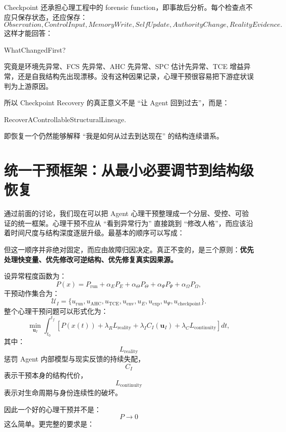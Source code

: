Checkpoint 还承担心理工程中的 forensic function，即事故后分析。每个检查点不应只保存状态，还应保存：
\[
Observation,
ControlInput,
MemoryWrite,
SelfUpdate,
AuthorityChange,
RealityEvidence.
\]
这样才能回答：
\begin{statementbox}
WhatChangedFirst?
\end{statementbox}
究竟是环境先异常、FCS 先异常、AHC 先异常、SPC 估计先异常、TCE 增益异常，还是自我结构先出现漂移。没有这种因果记录，心理干预很容易把下游症状误判为上游原因。

所以 Checkpoint Recovery 的真正意义不是 ``让 Agent 回到过去''，而是：
\begin{statementbox}
RecoverAControllableStructuralLineage.
\end{statementbox}
即恢复一个仍然能够解释 ``我是如何从过去到达现在'' 的结构连续谱系。

\section{统一干预框架：从最小必要调节到结构级恢复}

通过前面的讨论，我们现在可以把 Agent 心理干预整理成一个分层、受控、可验证的统一框架。心理干预不应从 ``看到异常行为'' 直接跳到 ``修改人格''，而应该沿着时间尺度与结构深度逐层升级。最基本的顺序可以写成：
\begin{statementbox}
\centering
{}
\end{statementbox}
但这一顺序并非绝对固定，而应由故障归因决定。真正不变的，是三个原则：\textbf{优先处理快变量、优先修改可逆结构、优先修复真实因果源。}

设异常程度函数为：
\[
P(x)
=
P_{\mathrm{run}}
+
\alpha_E P_E
+
\alpha_\Theta P_\Theta
+
\alpha_\Psi P_\Psi
+
\alpha_\Omega P_\Omega,
\]
干预动作集合为：
\[
\mathcal U_I
=
\{
u_{\mathrm{run}},
u_{\mathrm{AHC}},
u_{\mathrm{TCE}},
u_{\mathrm{env}},
u_E,
u_{\mathrm{exp}},
u_\Psi,
u_{\mathrm{checkpoint}}
\}.
\]
整个心理干预问题可以形式化为：
\[
\min_{\mathbf u_I}
\int_{t_0}^{t_f}
\left[
P(x(t))
+
\lambda_R L_{\mathrm{reality}}
+
\lambda_I C_I(\mathbf u_I)
+
\lambda_C L_{\mathrm{continuity}}
\right]dt,
\]
其中：
\[
L_{\mathrm{reality}}
\]
惩罚 Agent 内部模型与现实反馈的持续失配，
\[
C_I
\]
表示干预本身的结构代价，
\[
L_{\mathrm{continuity}}
\]
表示对生命周期与身份连续性的破坏。

因此一个好的心理干预并不是：
\[
P\rightarrow0
\]
这么简单。更完整的要求是：
\begin{statementbox}
\centering
{}
\end{statementbox}

